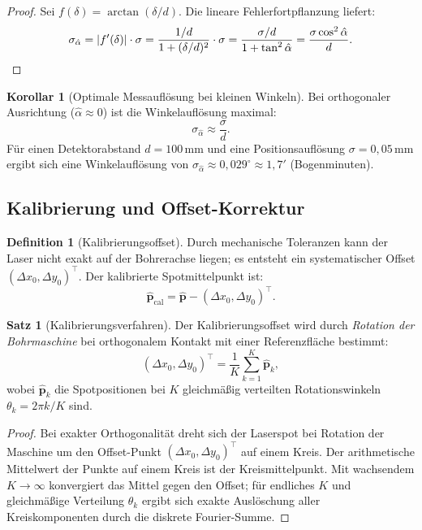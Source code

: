 ﻿\documentclass[a4paper,12pt]{article}
\theoremstyle{definition}
\newtheorem{definition}{Definition}
\newtheorem{satz}{Satz}
\newtheorem{korollar}{Korollar}
\begin{document}
\begin{proof}
  Sei $f(\delta) = \arctan(\delta/d)$.
  Die lineare Fehlerfortpflanzung liefert:
  \[
    \sigma_{\hat{\alpha}} = |f'(\delta)| \cdot \sigma
    = \frac{1/d}{1+(\delta/d)^2} \cdot \sigma
    = \frac{\sigma/d}{1+\tan^2\hat{\alpha}}
    = \frac{\sigma \cos^2\hat{\alpha}}{d}. \qedhere
  \]
\end{proof}

\begin{korollar}[Optimale Messauflösung bei kleinen Winkeln]
  Bei orthogonaler Ausrichtung ($\hat{\alpha} \approx 0$) ist die Winkel\-auflösung maximal:
  \[
    \sigma_{\hat{\alpha}} \approx \frac{\sigma}{d}.
  \]
  Für einen Detektorabstand $d = 100\,\mathrm{mm}$ und eine Positionsauflösung
  $\sigma = 0{,}05\,\mathrm{mm}$ ergibt sich eine Winkelauflösung von
  $\sigma_{\hat{\alpha}} \approx 0{,}029^\circ \approx 1{,}7'$ (Bogenminuten).
\end{korollar}

\subsection{Kalibrierung und Offset-Korrektur}

\begin{definition}[Kalibrierungsoffset]
  Durch mechanische Toleranzen kann der Laser nicht exakt auf der Bohrerachse
  liegen; es entsteht ein systematischer Offset $(\Delta x_0, \Delta y_0)^\top$.
  Der kalibrierte Spotmittelpunkt ist:
  \[
    \hat{\mathbf{p}}_{\mathrm{cal}} = \hat{\mathbf{p}} - (\Delta x_0, \Delta y_0)^\top.
  \]
\end{definition}

\begin{satz}[Kalibrierungsverfahren]
  Der Kalibrierungsoffset wird durch \emph{Rotation der Bohrmaschine} bei
  orthogonalem Kontakt mit einer Referenzfläche bestimmt:
  \[
    (\Delta x_0, \Delta y_0)^\top
    = \frac{1}{K}\sum_{k=1}^{K} \hat{\mathbf{p}}_k,
  \]
  wobei $\hat{\mathbf{p}}_k$ die Spotpositionen bei $K$ gleichmäßig verteilten
  Rotationswinkeln $\theta_k = 2\pi k/K$ sind.
\end{satz}

\begin{proof}
  Bei exakter Orthogonalität dreht sich der Laserspot bei Rotation der
  Maschine um den Offset-Punkt $(\Delta x_0, \Delta y_0)^\top$ auf einem Kreis.
  Der arithmetische Mittelwert der Punkte auf einem Kreis ist der Kreismittelpunkt.
  Mit wachsendem $K \to \infty$ konvergiert das Mittel gegen den Offset;
  für endliches $K$ und gleichmäßige Verteilung $\theta_k$ ergibt sich
  exakte Auslöschung aller Kreiskomponenten durch die diskrete Fourier-Summe. \qedhere
\end{proof}
\end{document}
